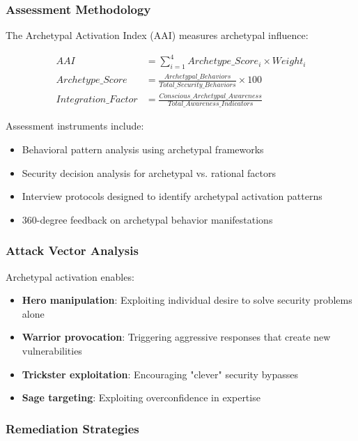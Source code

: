 \documentclass[11pt,a4paper]{article}
\begin{document}
\subsubsection{Assessment Methodology}

The Archetypal Activation Index (AAI) measures archetypal influence:

\begin{align}
AAI &= \sum_{i=1}^{4} Archetype\_Score_i \times Weight_i \\
Archetype\_Score &= \frac{Archetypal\_Behaviors}{Total\_Security\_Behaviors} \times 100 \\
Integration\_Factor &= \frac{Conscious\_Archetypal\_Awareness}{Total\_Awareness\_Indicators}
\end{align}

Assessment instruments include:
\begin{itemize}
\item Behavioral pattern analysis using archetypal frameworks
\item Security decision analysis for archetypal vs. rational factors
\item Interview protocols designed to identify archetypal activation patterns
\item 360-degree feedback on archetypal behavior manifestations
\end{itemize}

\subsubsection{Attack Vector Analysis}

Archetypal activation enables:

\begin{itemize}
\item \textbf{Hero manipulation}: Exploiting individual desire to solve security problems alone
\item \textbf{Warrior provocation}: Triggering aggressive responses that create new vulnerabilities
\item \textbf{Trickster exploitation}: Encouraging "clever" security bypasses
\item \textbf{Sage targeting}: Exploiting overconfidence in expertise
\end{itemize}

\subsubsection{Remediation Strategies}
\end{document}
